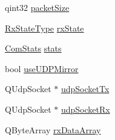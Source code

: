 \begin{DoxyCompactItemize}
\item 
qint32 \hyperlink{group___u_a_v_talk_plugin_gaa014be97504e5d24ac39f2808976685e}{packet\-Size}
\item 
\hyperlink{group___u_a_v_talk_plugin_ga7f7ca2a64b0ea5ec26fb64d06bf9e09b}{Rx\-State\-Type} \hyperlink{group___u_a_v_talk_plugin_gacce7e3b2035887b09dce0fdbba0f1b58}{rx\-State}
\item 
\hyperlink{struct_u_a_v_talk_1_1_com_stats}{Com\-Stats} \hyperlink{group___u_a_v_talk_plugin_ga35edebb70765f832afb1174152d4e20c}{stats}
\item 
bool \hyperlink{group___u_a_v_talk_plugin_ga5198259bc34e6f215c111d731b822e3f}{use\-U\-D\-P\-Mirror}
\item 
Q\-Udp\-Socket $\ast$ \hyperlink{group___u_a_v_talk_plugin_ga02f40e7ac97a6778928a5e9869ea5bc8}{udp\-Socket\-Tx}
\item 
Q\-Udp\-Socket $\ast$ \hyperlink{group___u_a_v_talk_plugin_ga3fe3d99135440f58cb74fb73a4055ef4}{udp\-Socket\-Rx}
\item 
Q\-Byte\-Array \hyperlink{group___u_a_v_talk_plugin_ga053813b68171430545f1bc1d69d450a0}{rx\-Data\-Array}
\end{DoxyCompactItemize}
